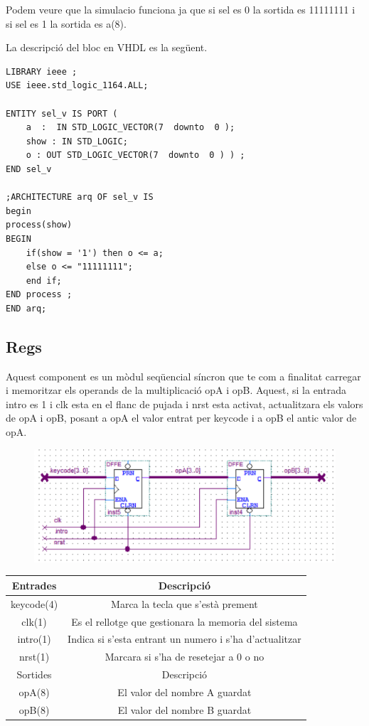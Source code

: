 \documentclass[12pt, a4papre]{article}
\begin{document}
	Podem veure que la simulacio funciona ja que si sel es 0 la sortida es 11111111 i si sel es 1 la sortida es a(8).
	
	La descripció del bloc en VHDL es la següent.
	
	\begin{lstlisting}[style=vhdl, frame=single, basicstyle=\small]
LIBRARY ieee ; 
USE ieee.std_logic_1164.ALL;

ENTITY sel_v IS PORT (
	a  :  IN STD_LOGIC_VECTOR(7  downto  0 );
	show : IN STD_LOGIC;
	o : OUT STD_LOGIC_VECTOR(7  downto  0 ) ) ;
END sel_v

;ARCHITECTURE arq OF sel_v IS
begin
process(show)
BEGIN
	if(show = '1') then o <= a;
	else o <= "11111111";
	end if;
END process ;
END arq;
\end{lstlisting}
	
	\subsection{Regs}
	
	Aquest component es un mòdul seqüencial síncron que te com a finalitat carregar i memoritzar els operands de la multiplicació opA i opB. Aquest, si la entrada intro es 1 i clk esta en el flanc de pujada i nrst esta activat, actualitzara els valors de opA i opB, posant a opA el valor entrat per keycode i a opB el antic valor de opA.
	
	\begin{figure}[H]
		\begin{center}
		\includegraphics[width=130mm]{regs.png}
		\end{center}
	\end{figure}
	
	\begin{table}[h!]
		\centering
		 \begin{tabular}{|c | c|} 
			 \hline
			 Entrades & Descripció\\ [0.5ex] 
			 \hline
			 keycode(4) & Marca la tecla que s'està prement \\
			 clk(1) & Es el rellotge que gestionara la memoria del sistema\\
			 intro(1) & Indica si s'esta entrant un numero i s'ha d'actualitzar\\
			 nrst(1) & Marcara si s'ha de resetejar a 0 o no \\ [1ex] 
			 \hline\hline
			 Sortides & Descripció\\ [0.5ex] 
			 \hline
			 opA(8) & El valor del nombre A guardat\\
			 opB(8) & El valor del nombre B guardat\\
			 \hline
		 \end{tabular}
	\end{table}
	
\end{document}

